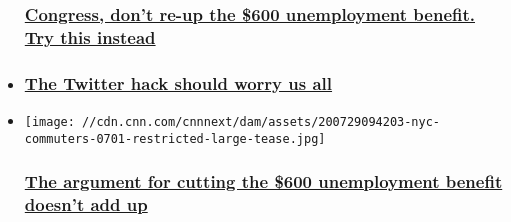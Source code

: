 \begin{itemize}
{  \subsubsection{\texorpdfstring{\href{/2020/07/27/perspectives/unemployment-insurance-benefit-payments-economy/index.html}{Congress,
  don't re-up the \$600 unemployment benefit. Try this
  instead}}{Congress, don't re-up the \$600 unemployment benefit. Try this instead}}\label{congress-dont-re-up-the-600-unemployment-benefit-try-this-instead}}
\item
  \hypertarget{the-twitter-hack-should-worry-us-all}{%
  \subsubsection{\texorpdfstring{\href{/2020/07/24/perspectives/twitter-hack-threat/index.html}{The
  Twitter hack should worry us
  all}}{The Twitter hack should worry us all}}\label{the-twitter-hack-should-worry-us-all}}
\end{itemize}

\begin{itemize}
\item
  \href{/2020/07/30/perspectives/600-unemployment-benefit/index.html}{}

  \texttt{[image: //cdn.cnn.com/cnnnext/dam/assets/200729094203-nyc-commuters-0701-restricted-large-tease.jpg]}

  \hypertarget{the-argument-for-cutting-the-600-unemployment-benefit-doesnt-add-up}{%
  \subsubsection{\texorpdfstring{\href{/2020/07/30/perspectives/600-unemployment-benefit/index.html}{The
  argument for cutting the \$600 unemployment benefit doesn't add
  up}}{The argument for cutting the \$600 unemployment benefit doesn't add up}}\label{the-argument-for-cutting-the-600-unemployment-benefit-doesnt-add-up}}
\end{itemize}

